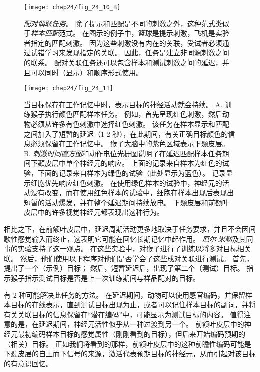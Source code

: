 \begin{figure}[htbp]
	\centering
	\texttt{[image: chap24/fig\_24\_10\_B]}
	\caption{\textit{配对偶联任务}。
		除了提示和匹配是不同的刺激之外，这种范式类似于\textit{样本匹配}范式。
		在图示的例子中，篮球是提示刺激，飞机是实验者指定的匹配刺激。
		因为这些刺激没有内在的关联，受试者必须通过试错学习来发现指定的关联。
		因此，任务是建立非同源刺激之间的联系。
		配对关联任务还可以包含样本和测试刺激之间的延迟，并且可以同时（显示）和顺序形式使用。}
	\label{fig:24_10_b}
\end{figure}


\begin{figure}[htbp]
	\centering
	\texttt{[image: chap24/fig\_24\_11]}
	\caption{当目标保存在工作记忆中时，表示目标的神经活动就会持续。 
		A. 训练猴子执行颜色匹配样本任务。
		例如，首先呈现红色刺激，然后动物必须从许多有色刺激中选择红色刺激。
		该任务在样本显示和匹配之间加入了短暂的延迟（1-2 秒），在此期间，有关正确目标颜色的信息必须保留在工作记忆中。
		猴子大脑中的紫色区域表示下颞皮层。
		B. \textit{刺激时间直方图}和动作电位光栅图说明了在延迟匹配样本任务期间下颞皮层中单个神经元的响应。
		上面的记录来自样本为红色的试验，下面的记录来自样本为绿色的试验（此处显示为蓝色）。
		记录显示细胞优先响应红色刺激。
		在使用绿色样本的试验中，神经元的活动没有改变，而在使用红色样本的试验中，细胞在样本出现后表现出短暂的活动爆发，并在整个延迟期间持续放电。
		下颞皮层和前额叶皮层中的许多视觉神经元都表现出这种行为。}
	\label{fig:24_11}
\end{figure}


相比之下，在前额叶皮层中，延迟周期活动更多地取决于任务要求，并且不会因间歇性感觉输入而终止，这表明它可能在回忆长期记忆中起作用。
\textit{厄尔$\cdot$米勒}及其同事的实验支持了这一观点\cite{miller1991neural}。
在这些实验中，对猴子进行了训练以将多对目标相关联。
然后，他们使用以下程序对他们是否学会了这些成对关联进行测试。
首先，提出了一个（示例）目标； 然后，短暂延迟后，出现了第二个（测试）目标。
指示猴子指示测试目标是否是上一次训练期间与样品配对的目标。


有 2 种可能解决此任务的方法。
在延迟期间，动物可以使用感官编码，并保留样本目标的在线表示，直到测试目标出现为止，或者可以记住样本目标的副词，并将有关关联目标的信息保留在“潜在编码”中，可能显示为测试目标的内容。
值得注意的是，在延迟期间，神经元活性似乎从一种过渡到另一个。
前额叶皮层中的神经元最初编码样本目标的感觉属性（刚刚看到的目标），但后来开始编码预期的（相关）目标。
正如我们将看到的那样，前额叶皮层中的这种前瞻性编码可能是下颞皮层的自上而下信号的来源，激活代表预期目标的神经元，从而引起对该目标的有意识回忆。


